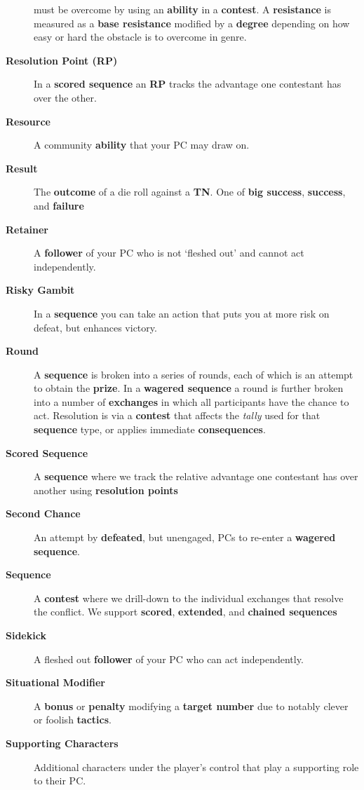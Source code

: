 \documentclass[
  11pt,
]{article}
\begin{document}
\begin{description}
must be overcome by using an \textbf{ability} in a \textbf{contest}. A
\textbf{resistance} is measured as a \textbf{base resistance} modified
by a \textbf{degree} depending on how easy or hard the obstacle is to
overcome in genre.
\item[\textbf{Resolution Point (RP)}]
In a \textbf{scored sequence} an \textbf{RP} tracks the advantage one
contestant has over the other.
\item[\textbf{Resource}]
A community \textbf{ability} that your PC may draw on.
\item[\textbf{Result}]
The \textbf{outcome} of a die roll against a \textbf{TN}. One of
\textbf{big success}, \textbf{success}, and \textbf{failure}
\item[\textbf{Retainer}]
A \textbf{follower} of your PC who is not `fleshed out' and cannot act
independently.
\item[\textbf{Risky Gambit}]
In a \textbf{sequence} you can take an action that puts you at more risk
on defeat, but enhances victory.
\item[\textbf{Round}]
A \textbf{sequence} is broken into a series of rounds, each of which is
an attempt to obtain the \textbf{prize}. In a \textbf{wagered sequence}
a round is further broken into a number of \textbf{exchanges} in which
all participants have the chance to act. Resolution is via a
\textbf{contest} that affects the \emph{tally} used for that
\textbf{sequence} type, or applies immediate \textbf{consequences}.
\item[\textbf{Scored Sequence}]
A \textbf{sequence} where we track the relative advantage one contestant
has over another using \textbf{resolution points}
\item[\textbf{Second Chance}]
An attempt by \textbf{defeated}, but unengaged, PCs to re-enter a
\textbf{wagered sequence}.
\item[\textbf{Sequence}]
A \textbf{contest} where we drill-down to the individual exchanges that
resolve the conflict. We support \textbf{scored}, \textbf{extended}, and
\textbf{chained sequences}
\item[\textbf{Sidekick}]
A fleshed out \textbf{follower} of your PC who can act independently.
\item[\textbf{Situational Modifier}]
A \textbf{bonus} or \textbf{penalty} modifying a \textbf{target number}
due to notably clever or foolish \textbf{tactics}.
\item[\textbf{Supporting Characters}]
Additional characters under the player's control that play a supporting
role to their PC.

\end{description}
\end{document}
